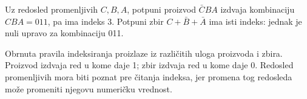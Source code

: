 Uz redosled promenljivih \(C,B,A\), potpuni proizvod \(\bar CBA\) izdvaja kombinaciju \(CBA=011\), pa ima indeks 3. Potpuni zbir \(C+\bar B+\bar A\) ima isti indeks: jednak je nuli upravo za kombinaciju 011.

Obrnuta pravila indeksiranja proizlaze iz različitih uloga proizvoda i zbira. Proizvod izdvaja red u kome daje 1; zbir izdvaja red u kome daje 0. Redosled promenljivih mora biti poznat pre čitanja indeksa, jer promena tog redosleda može promeniti njegovu numeričku vrednost.
